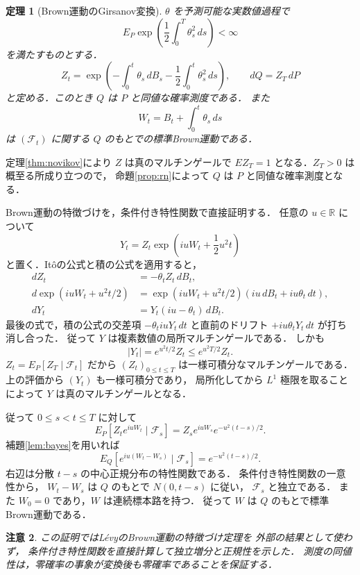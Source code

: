 \documentclass[a5paper,10pt,onecolumn]{jsarticle}
\makeatletter
\theoremstyle{mathnotetheorem}
\newtheorem{theorem}{定理}[section]
\newtheorem{remark}[theorem]{注意}
\renewcommand{\proofname}{証明}
\renewenvironment{proof}[1][\proofname]{%
  \par\pushQED{\qed}\normalfont\topsep4\p@\@plus2\p@\relax
  \trivlist\item[\hskip\labelsep\bfseries #1]\ignorespaces
}{\popQED\endtrivlist\@endpefalse}
\makeatother
\begin{document}
\begin{theorem}[Brown運動のGirsanov変換]\label{thm:girsanov}
$\theta$ を予測可能な実数値過程で
\[
 E_P\exp\!\left(\frac12\int_0^T\theta_s^2\,ds\right)<\infty
\]
を満たすものとする．
\[
 Z_t=\exp\!\left(
 -\int_0^t\theta_s\,dB_s
 -\frac12\int_0^t\theta_s^2\,ds\right),\qquad
 dQ=Z_T\,dP
\]
と定める．このとき $Q$ は $P$ と同値な確率測度である．
また
\[
 W_t=B_t+\int_0^t\theta_s\,ds
\]
は $(\mathcal F_t)$ に関する $Q$ のもとでの標準Brown運動である．
\end{theorem}
\begin{proof}
定理\ref{thm:novikov}により $Z$ は真のマルチンゲールで
$EZ_T=1$ となる．$Z_T>0$ は概至る所成り立つので，
命題\ref{prop:rn}によって $Q$ は $P$ と同値な確率測度となる．

Brown運動の特徴づけを，条件付き特性関数で直接証明する．
任意の $u\in\mathbb R$ について
\[
 Y_t=Z_t\exp\!\left(iuW_t+\frac12u^2t\right)
\]
と置く．It\^oの公式と積の公式を適用すると，
\begin{align*}
 dZ_t&=-\theta_tZ_t\,dB_t,\\
 d\exp(iuW_t+u^2t/2)
 &=\exp(iuW_t+u^2t/2)
   (iu\,dB_t+iu\theta_t\,dt),\\
 dY_t&=Y_t(iu-\theta_t)\,dB_t.
\end{align*}
最後の式で，積の公式の交差項
$-\theta_tiuY_t\,dt$ と直前のドリフト
$+iu\theta_tY_t\,dt$ が打ち消し合った．
従って $Y$ は複素数値の局所マルチンゲールである．
しかも
\[
 |Y_t|=e^{u^2t/2}Z_t\le e^{u^2T/2}Z_t.
\]
$Z_t=E_P[Z_T\mid\mathcal F_t]$ だから
$(Z_t)_{0\le t\le T}$ は一様可積分なマルチンゲールである．
上の評価から $(Y_t)$ も一様可積分であり，
局所化してから $L^1$ 極限を取ることによって
$Y$ は真のマルチンゲールとなる．

従って $0\le s<t\le T$ に対して
\[
 E_P[Z_t e^{iuW_t}\mid\mathcal F_s]
 =Z_s e^{iuW_s}e^{-u^2(t-s)/2}.
\]
補題\ref{lem:bayes}を用いれば
\[
 E_Q[e^{iu(W_t-W_s)}\mid\mathcal F_s]
 =e^{-u^2(t-s)/2}.
 \tag{$*$}
\]
右辺は分散 $t-s$ の中心正規分布の特性関数である．
条件付き特性関数の一意性から，
$W_t-W_s$ は $Q$ のもとで $N(0,t-s)$ に従い，
$\mathcal F_s$ と独立である．
また $W_0=0$ であり，$W$ は連続標本路を持つ．
従って $W$ は $Q$ のもとで標準Brown運動である．
\end{proof}

\begin{remark}
この証明ではL\'evyのBrown運動の特徴づけ定理を
外部の結果として使わず，
条件付き特性関数を直接計算して独立増分と正規性を示した．
測度の同値性は，零確率の事象が変換後も零確率であることを保証する．
\end{remark}
\end{document}
